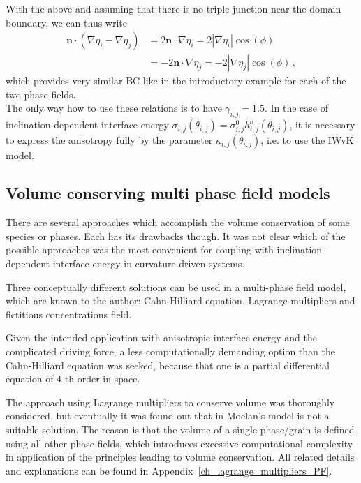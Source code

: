 	With the above and assuming that there is no triple junction near the domain boundary, we can thus write
	\begin{equation}
		\begin{split}
			\bm{n}\cdot(\nabla\eta_i-\nabla\eta_j) &= 2\bm{n}\cdot\nabla\eta_i = 2|\nabla\eta_i|\cos(\phi) \\ &= -2\bm{n}\cdot\nabla\eta_j = -2|\nabla\eta_j|\cos(\phi) \,,
		\end{split}
	\end{equation}
	which provides very similar BC like in the introductory example for each of the two phase fields.\\
	The only way how to use these relations is to have $\gamma_{i,j}=1.5$. In the case of inclination-dependent interface energy $\sigma_{i,j}(\theta_{i,j})=\sigma_{i,j}^0h_{i,j}^\sigma(\theta_{i,j})$, it is necessary to express the anisotropy fully by the parameter $\kappa_{i,j}(\theta_{i,j})$, i.e. to use the IWvK model.
	
	\subsection{Volume conserving multi phase field models}\label{sec_volume_cons_PF_ch_NPA_PF}
	There are several approaches which accomplish the volume conservation of some species or phases. Each has its drawbacks though. It was not clear which of the possible approaches was the most convenient for coupling with inclination-dependent interface energy in curvature-driven systems.
	
	Three conceptually different solutions can be used in a multi-phase field model, which are known to the author: Cahn-Hilliard equation, Lagrange multipliers and fictitious concentrations field. 
	
	Given the intended application with anisotropic interface energy and the complicated driving force, a less computationally demanding option than the Cahn-Hilliard equation was seeked, because that one is a partial differential equation of 4-th order in space. 
	
	The approach using Lagrange multipliers to conserve volume was thoroughly considered, but eventually it was found out that in Moelan's model is not a suitable solution. The reason is that the volume of a single phase/grain is defined using all other phase fields, which introduces excessive computational complexity in application of the principles leading to volume conservation. All related details and explanations can be found in Appendix~\ref{ch_lagrange_multipliers_PF}.
	
